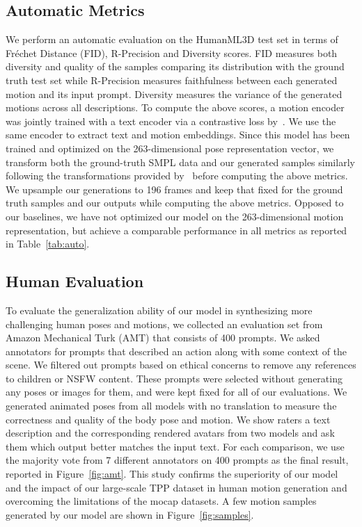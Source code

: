 \documentclass[10pt,twocolumn,letterpaper]{article}
\begin{document}
\subsection{Automatic Metrics}
We perform an automatic evaluation on the HumanML3D test set in terms of Fr\'echet Distance (FID), R-Precision and Diversity scores. FID measures both diversity and quality of the samples comparing its distribution with the ground truth test set while R-Precision measures faithfulness between each generated motion and its input prompt. Diversity measures the variance of the generated motions across all descriptions. To compute the above scores, a motion encoder was jointly trained with a text encoder via a contrastive loss by~\cite{guo2022t2m}. We use the same encoder to extract text and motion embeddings. Since this model has been trained and optimized on the 263-dimensional pose representation vector, we transform both the ground-truth SMPL data and our generated samples similarly following the transformations provided by~\cite{guo2020a2m} before computing the above metrics. We upsample our generations to 196 frames and keep that fixed for the ground truth samples and our outputs while computing the above metrics. Opposed to our baselines, we have not optimized our model on the 263-dimensional motion representation, but achieve a comparable performance in all metrics as reported in Table~\ref{tab:auto}.



\subsection{Human Evaluation}
To evaluate the generalization ability of our model in synthesizing more challenging human poses and motions, we collected an evaluation set from Amazon Mechanical Turk (AMT) that consists of 400 prompts. We asked annotators for prompts that described an action along with some context of the scene. We filtered out prompts based on ethical concerns to remove any references to children or NSFW content. These prompts were selected without generating any poses or images for them, and were kept fixed for all of our evaluations. We generated animated poses from all models with no translation to measure the correctness and quality of the body pose and motion. 
We show raters a text description and the corresponding rendered
avatars from two models and ask them which output better matches
the input text. For each comparison, we use the majority vote from
7 different annotators on 400 prompts as the final result, reported in Figure~\ref{fig:amt}. This study confirms the superiority of our model and the impact of our large-scale TPP dataset in human motion generation and overcoming the limitations of the mocap datasets. A few motion samples generated by our model are shown in Figure~\ref{fig:samples}.
\end{document}
